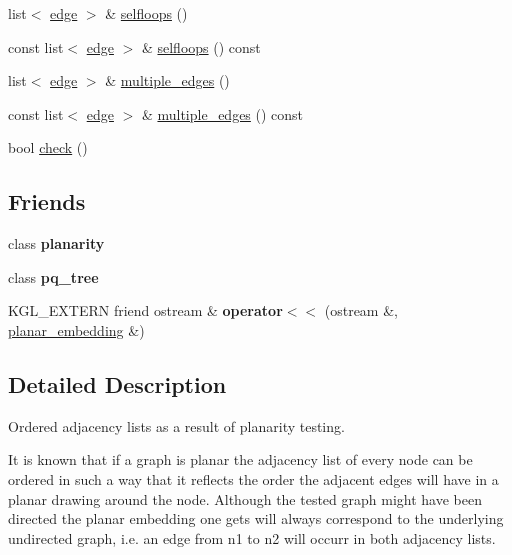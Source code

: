 \begin{DoxyCompactItemize}
list$<$ \mbox{\hyperlink{classedge}{edge}} $>$ \& \mbox{\hyperlink{classplanar__embedding_ab04859be18352bc53a120b0676a499ba}{selfloops}} ()
\item 
const list$<$ \mbox{\hyperlink{classedge}{edge}} $>$ \& \mbox{\hyperlink{classplanar__embedding_a25e47defbdda4552bf1ff98a3e7682e5}{selfloops}} () const
\item 
list$<$ \mbox{\hyperlink{classedge}{edge}} $>$ \& \mbox{\hyperlink{classplanar__embedding_afb50ef8f3b5b2c6690b9d364db21f36f}{multiple\+\_\+edges}} ()
\item 
const list$<$ \mbox{\hyperlink{classedge}{edge}} $>$ \& \mbox{\hyperlink{classplanar__embedding_aebec933f9aac54914ee7439028e37418}{multiple\+\_\+edges}} () const
\item 
bool \mbox{\hyperlink{classplanar__embedding_a6462d40327bf7c4c91523b888bb45cb3}{check}} ()
\end{DoxyCompactItemize}
\subsection*{Friends}
\begin{DoxyCompactItemize}
\item 
\mbox{\label{classplanar__embedding_ab6a02224dbc06343d95919289aec77c8}} 
class {\bfseries planarity}
\item 
\mbox{\label{classplanar__embedding_a0a5be4bb438c891059fae98f607f2a9c}} 
class {\bfseries pq\+\_\+tree}
\item 
\mbox{\label{classplanar__embedding_ac972f6f97db38c01e25404f661bc9355}} 
K\+G\+L\+\_\+\+E\+X\+T\+E\+RN friend ostream \& {\bfseries operator$<$$<$} (ostream \&, \mbox{\hyperlink{classplanar__embedding}{planar\+\_\+embedding}} \&)
\end{DoxyCompactItemize}


\subsection{Detailed Description}
Ordered adjacency lists as a result of planarity testing. 

It is known that if a graph is planar the adjacency list of every node can be ordered in such a way that it reflects the order the adjacent edges will have in a planar drawing around the node. Although the tested graph might have been directed the planar embedding one gets will always correspond to the underlying undirected graph, i.\+e. an edge from {\ttfamily n1} to {\ttfamily n2} will occurr in both adjacency lists. 

